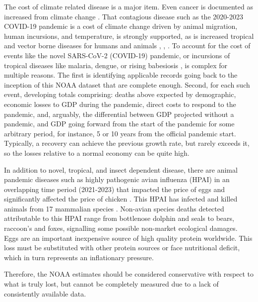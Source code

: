 \documentclass{article}
\begin{document}
The cost of climate related disease is a major item. Even cancer is documented as increased from climate change \cite{Nogueira2020ClimateChangeAndCancer}. That contagious disease such as the 2020-2023 COVID-19 pandemic is a cost of climate change driven by animal migration, human incursions, and temperature, is strongly supported, as is increased tropical and vector borne diseases for humans and animals \cite{Carlson2022ClimateChangeIncreasesCross-speciesViralTransmission,Casadevall2020ClimateNewDisease,Chen2021COVID}, \cite{Tidman2021NTDs}, \cite{BOOTH2018NTDs}. To account for the cost of events like the novel SARS-CoV-2 (COVID-19) pandemic, or incursions of tropical diseases like malaria, dengue, or rising babesiosis \cite{Ssentongo2024BeyondHumanBabesiosis_PrevalenceMortality}, is complex for multiple reasons. The first is identifying applicable records going back to the inception of this NOAA dataset that are complete enough. Second, for each such event, developing totals comprising: deaths above expected by demographic, economic losses to GDP during the pandemic, direct costs to respond to the pandemic, and, arguably, the differential between GDP projected without a pandemic, and GDP going forward from the start of the pandemic for some arbitrary period, for instance, 5 or 10 years from the official pandemic start. Typically, a recovery can achieve the previous growth rate, but rarely exceeds it, so the losses relative to a normal economy can be quite high. 

In addition to novel, tropical, and insect dependent disease, there are animal pandemic diseases such as highly pathogenic avian influenza (HPAI) \cite{LIANG2022HPAI_H5N6} in an overlapping time period (2021-2023) that impacted the price of eggs \cite{Knight2022USDA_HPAI_egg_prices,FRED2023APU0000708111} and significantly affected the price of chicken \cite{FRED2023APU0000706111}. This HPAI has infected and killed animals from 17 mammalian species \cite{USDA2022_HPAI_mammal_detection}. Non-avian species deaths detected attributable to this HPAI range from bottlenose dolphin and seals to bears, raccoon's and foxes, signalling some possible non-market ecological damages. Eggs are an important inexpensive source of high quality protein worldwide. This loss must be substituted with other protein sources or face nutritional deficit, which in  turn represents an inflationary pressure. 

Therefore, the NOAA estimates should be considered conservative with respect to what is truly lost, but cannot be completely measured due to a lack of consistently available data.
\end{document}
